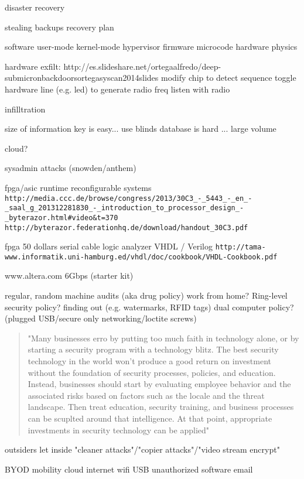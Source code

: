 \documentclass[dvipdfm]{book}
\begin{document}
disaster recovery


stealing backups
recovery plan

software
  user-mode
  kernel-mode
  hypervisor
  firmware
  microcode
  hardware
  physics

hardware exfilt:
  http://es.slideshare.net/ortegaalfredo/deep-submicronbackdoorsortegasyscan2014slides
    modify chip to detect sequence
    toggle hardware line (e.g. led) to generate radio freq
    listen with radio

infilltration

size of information
  key is easy... use blinds
  database is hard ... large volume

cloud?

sysadmin attacks (snowden/anthem)

fpga/asic
runtime reconfigurable systems
\verb|http://media.ccc.de/browse/congress/2013/30C3_-_5443_-_en_-_saal_g_201312281830_-_introduction_to_processor_design_-_byterazor.html#video&t=370|
\verb|http://byterazor.federationhq.de/download/handout_30C3.pdf|

fpga 50 dollars
  serial cable
  logic analyzer
  VHDL / Verilog
\verb|http://tama-www.informatik.uni-hamburg.ed/vhdl/doc/cookbook/VHDL-Cookbook.pdf|

www.altera.com 6Gbps (starter kit)

regular, random machine audits (aka drug policy)
work from home?
Ring-level security policy?
finding out (e.g. watermarks, RFID tags)
dual computer policy? (plugged USB/secure only networking/loctite screws)

\begin{quote}
"Many businesses erro by putting too much faith in technology alone,
or by starting a security program with a technology blitz. The best
security technology in the world won't produce a good return on
investment without the foundation of security processes, policies, and
education. Instead, businesses should start by evaluating employee
behavior and the associated risks based on factors such as the locale
and the threat landscape. Then treat education, security training, and
business processes can be scuplted around that intelligence. At that
point, appropriate investments in security technology can be applied"
\cite{2}
\end{quote}

outsiders let inside
  "cleaner attacks"/"copier attacks"/"video stream encrypt"

BYOD
mobility
cloud
internet
wifi
USB
unauthorized software
email
\end{document}

